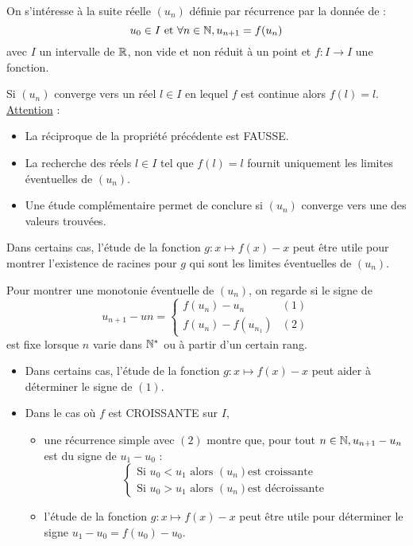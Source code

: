 \begin{defi}
    On s’intéresse à la suite réelle \((u_n)\) définie par récurrence par la donnée de :\\
    \[u_0 \in I \text{ et } \forall n \in \mathbb{N}, u_{n+1} = f (u_n)\]
    avec \(I\) un intervalle de \(\mathbb{R}\), non vide et non réduit à un point et \(f : I \to I \) une fonction.
\end{defi}
\begin{defprop}
    
    Si \((u_n)\) converge vers un réel \(l \in I\) en lequel \(f\) est continue alors \(f (l) = l\).\\
    \underline{Attention} : \\
    \begin{itemize}
        \item La réciproque de la propriété précédente est FAUSSE.
        \item La recherche des réels \(l \in I\) tel que \(f (l) = l\) fournit uniquement les limites éventuelles de \((u_n)\).
        \item Une étude complémentaire permet de conclure si \((u_n)\) converge vers une des valeurs trouvées.
    \end{itemize}
    Dans certains cas, l’étude de la fonction \(g : x \mapsto f (x) - x\) peut être utile pour montrer l’existence de racines pour \(g\) qui sont les limites éventuelles de \((u_n)\).
\end{defprop}

\begin{defprop}
    Pour montrer une monotonie éventuelle de \((u_n)\), on regarde si le signe de
    \[u_{n+1} - un = \begin{cases}
        f(u_n)-u_n &(1)\\
        f(u_n)-f(u_{n_1}) &(2)
    \end{cases}\]
    est fixe lorsque \(n\) varie dans \(\mathbb{N}^*\) ou à partir d’un certain rang.
    \begin{itemize}
        \item Dans certains cas, l’étude de la fonction \(g : x \mapsto f (x) - x\) peut aider à déterminer le signe de \((1)\).
        \item Dans le cas où \(f\) est CROISSANTE sur \(I\),
        \begin{itemize}
            \item une récurrence simple avec \((2)\) montre que, pour tout \(n \in \mathbb{N}, u_{n+1} - u_n\) est du signe de \( u_1 - u_0\) :
            \[\begin{cases} 
                \text{Si }u_0 < u_1 \text{ alors } (u_n) \text{est croissante}\\
                \text{Si }u_0 > u_1 \text{ alors } (u_n) \text{est décroissante}
            \end{cases}\]
            \item l’étude de la fonction \(g : x \mapsto f (x)-x\) peut être utile pour déterminer le signe \(u_1 -u_0 = f (u_0)-u_0\).
        \end{itemize} 
    \end{itemize}
\end{defprop}